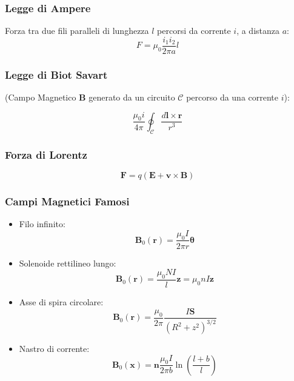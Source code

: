 \documentclass[a4paper]{scrarticle}
\begin{document}
\subsubsection*{Legge di Ampere}
Forza tra due fili paralleli di lunghezza $l$ percorsi da corrente $i$, a distanza $a$:
\begin{equation*}
    F = \mu_0  \frac{i_1i_2}{2\pi a}l
\end{equation*}


\subsubsection*{Legge di Biot Savart} 
(Campo Magnetico $\bm B$  generato da un circuito $\mathcal{C}$ percorso da una corrente $i$):

\begin{equation}
    \frac{\mu_0 i}{4 \pi} \oint_{\mathcal{C}} \frac {d\bm l \times \bm r}{r^3}
\end{equation}

\subsubsection*{Forza di Lorentz}

\begin{equation}
   \bm F = q (\bm E + \bm v \times \bm B )
\end{equation}

\subsubsection*{Campi Magnetici Famosi}
\begin{itemize}
    
    \item Filo infinito:
    \begin{equation}
        \bm B_0(\bm r) = \frac{\mu_0 I}{2\pi r} \bm \theta
    \end{equation}
    
    \item Solenoide rettilineo lungo:
    \begin{equation}
        \bm B_0 (\bm r) = \frac{\mu_0NI}{l} \bm z= \mu_0 nI \bm z
    \end{equation}
    
    \item Asse di spira circolare:
    \begin{equation}
        \bm B_0 (\bm r) = \frac{\mu_0}{2\pi} \frac{I \bm S}{(R^2 + z^2)^{3/2}}
    \end{equation}
    
    \item Nastro di corrente:
    \begin{equation}
        \bm B_0(\bm x) = \bm n \frac{\mu_0 I}{2\pi b} \ln\left(\frac{l + b}{l}\right)
    \end{equation}
\end{itemize}
\end{document}
